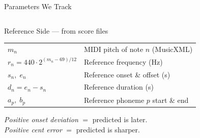 \documentclass[aspectratio=169,9pt]{beamer}
\begin{document}
\begin{frame}{Parameters We Track}
\begin{columns}[T]
      \begin{block}{Reference Side — from score files}
        \small
        \renewcommand{\arraystretch}{1.25}
        \begin{tabular}{@{}lp{5cm}@{}}
          $m_n$ & MIDI pitch of note $n$ (MusicXML) \\
          $r_n = 440\cdot 2^{(m_n-69)/12}$ & Reference frequency (Hz) \\
          $s_n,\; e_n$ & Reference onset \& offset (s) \\
          $d_n = e_n - s_n$ & Reference duration (s) \\
          $a_p,\; b_p$ & Reference phoneme $p$ start \& end \\
        \end{tabular}
        \medskip\par
        \small
        \textit{Positive onset deviation} $= $ predicted is later.\\
        \textit{Positive cent error} $= $ predicted is sharper.
      \end{block}
  \end{columns}
\end{frame}
\end{document}
